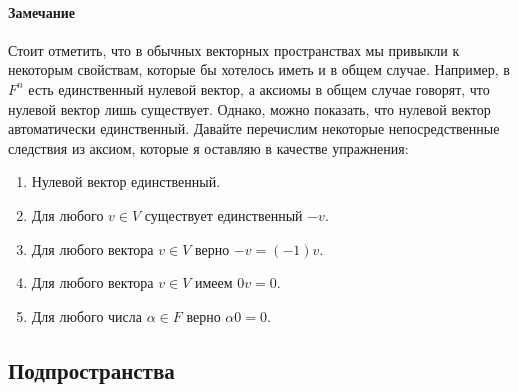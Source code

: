 \paragraph{Замечание}

Стоит отметить, что в обычных векторных пространствах мы привыкли к некоторым свойствам, которые бы хотелось иметь и в общем случае.
Например, в $F^n$ есть единственный нулевой вектор, а аксиомы в общем случае говорят, что нулевой вектор лишь существует.
Однако, можно показать, что нулевой вектор автоматически единственный.
Давайте перечислим некоторые непосредственные следствия из аксиом, которые я оставляю в качестве упражнения:
\begin{enumerate}
\item Нулевой вектор единственный.

\item Для любого $v\in V$ существует единственный $-v$.

\item Для любого вектора $v\in V$ верно $-v = (-1)v$.

\item Для любого вектора $v\in V$ имеем $0 v = 0$.

\item Для любого числа $\alpha \in F$ верно $\alpha 0 = 0$. %
\end{enumerate}

\subsection{Подпространства}


